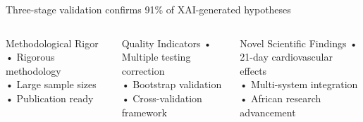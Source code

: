 \documentclass[10pt,aspectratio=169]{beamer}
\begin{document}
\begin{frame}{Three-stage validation confirms 91\% of XAI-generated hypotheses}
\vspace{0.5cm}
\begin{columns}[T]
\begin{block}{Methodological Rigor}
• Rigorous methodology \\
• Large sample sizes \\
• Publication ready
\end{block}

\begin{block}{Quality Indicators}
• Multiple testing correction \\
• Bootstrap validation \\
• Cross-validation framework
\end{block}

\begin{block}{Novel Scientific Findings}
• 21-day cardiovascular effects \\
• Multi-system integration \\
• African research advancement
\end{block}
\end{columns}
\end{frame}
\end{document}
